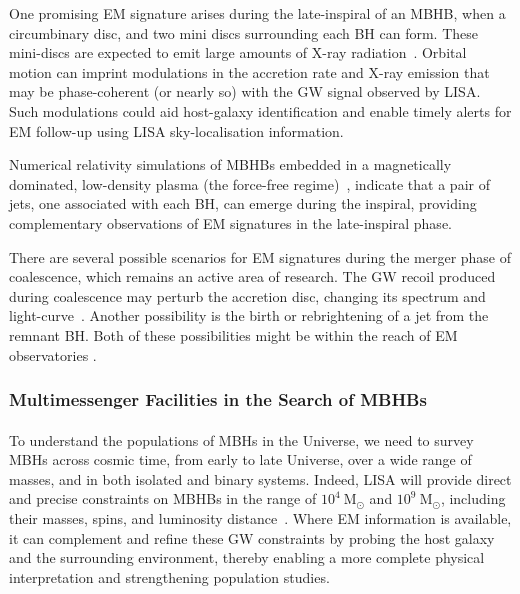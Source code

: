 \documentclass[a4paper,12pt]{article}
\begin{document}
One promising EM signature arises during the late-inspiral of an MBHB, when a circumbinary disc, and two mini discs surrounding each BH can form. These mini-discs are expected to emit large amounts of X-ray radiation~\cite{haiman2017electromagnetic}. Orbital motion can imprint modulations in the accretion rate and X-ray emission that may be phase-coherent (or nearly so) with the GW signal observed by LISA. Such modulations could aid host-galaxy identification \cite{haiman2017electromagnetic,tang2018late,dal2019detectability} and enable timely alerts for EM follow-up using LISA sky-localisation information.
 
Numerical relativity simulations of MBHBs embedded in a magnetically dominated, low-density plasma (the force-free regime)~\cite{palenzuela2010dual,moesta2012detectability}, indicate that a pair of jets, one associated with each BH, can emerge during the inspiral, providing complementary observations of EM signatures in the late-inspiral phase.
 
There are several possible scenarios for EM signatures during the merger phase of coalescence, which remains an active area of research. The GW recoil produced during coalescence may perturb the accretion disc, changing its spectrum and light-curve~\cite{gold2014accretion,khan2018disks}. Another possibility is the birth or rebrightening of a jet from the remnant BH. Both of these possibilities might be within the reach of EM observatories \cite{bogdanovic2022electromagnetic,mangiagli2022massive}.

\subsubsection{Multimessenger Facilities in the Search of MBHBs}
\label{subsubsec:MultiMFacilities}

\paragraph{}
To understand the populations of MBHs in the Universe, we need to survey MBHs across cosmic time, from early to late Universe, over a wide range of masses, and in both isolated and binary systems.  Indeed, LISA will provide direct and precise constraints on MBHBs in the range of $10^{4}~\mathrm{M}_{\odot}$ and $10^{9}~\mathrm{M}_{\odot}$, including their masses, spins, and luminosity distance~\cite{amaro2017laser}. Where EM information is available, it can complement and refine these GW constraints by probing the host galaxy and the surrounding environment, thereby enabling a more complete physical interpretation and strengthening population studies.
\end{document}
